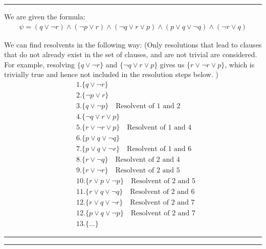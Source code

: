 \documentclass[12pt,letterpaper, onecolumn]{exam}
\begin{document}
\begin{questions}
    {\rule{17cm}{0.4pt}}
	\question[]
	\solutiontitle

	We are given the formula:
	\begin{align*}
		\psi = (q \lor \neg r) \land (\neg p \lor r) \land (\neg q \lor r \lor p) \land (p \lor q \lor \neg q) \land (\neg r \lor q)
	\end{align*}

	We can find resolvents in the following way:
	(Only resolutions that lead to clauses that do not already exist in the set of clauses, and are not trivial are considered. 
	For example, resolving $\{ q \lor \neg r \}$ and $\{ \neg q \lor r \lor p \}$ gives us $\{ r \lor \neg r \lor p \}$, which is trivially true and hence not included
	in the resolution steps below. )
	\begin{align*}
		& 1. \{ q \lor \neg r \} \\
		& 2. \{ \neg p \lor r \} \\
		& 3. \{ q \lor \neg p \} \quad \text{Resolvent of 1 and 2} \\
		& 4. \{ \neg q \lor r \lor p \} \\
		& 5. \{ r \lor \neg r \lor p \} \quad \text{Resolvent of 1 and 4} \\
		& 6. \{ p \lor q \lor \neg q \} \\
		& 7. \{ p \lor q \lor \neg r \} \quad \text{Resolvent of 1 and 6} \\
		& 8. \{ r \lor \neg q \} \quad \text{Resolvent of 2 and 4} \\
		& 9. \{ r \lor \neg r \} \quad \text{Resolvent of 2 and 5} \\
		& 10. \{ r \lor p \lor \neg p \} \quad \text{Resolvent of 2 and 5} \\
		& 11. \{ r \lor q \lor \neg q \} \quad \text{Resolvent of 2 and 6} \\
		& 12. \{ r \lor q \lor \neg r \} \quad \text{Resolvent of 2 and 7} \\
		& 12. \{ p \lor q \lor \neg p \} \quad \text{Resolvent of 2 and 7} \\
		& 13. \{ ... \}
	\end{align*}

    {\rule{17cm}{0.4pt}}
	\question[]
	\solutiontitle

    {\rule{17cm}{0.4pt}}

\end{questions}
\end{document}

